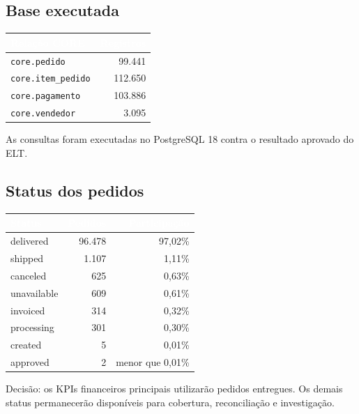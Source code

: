\documentclass[12pt,a4paper]{article}
\newcounter{none}
\newcommand{\CabecalhoTabela}[1]{\textcolor{white}{\textbf{#1}}}
\begin{document}
\subsection{Base
executada}\label{docs__analytics__evidencias_consultas_basicas_core.md__base-executada}

{\def\LTcaptype{none} %
\begin{longtable}[]{@{}lr@{}}
\toprule\noalign{}
\rowcolor{AzulCorporativo}
\CabecalhoTabela{Relação CORE} & \CabecalhoTabela{Registros} \\
\midrule\noalign{}
\endhead
\bottomrule\noalign{}
\endlastfoot
\nolinkurl{core.pedido} & 99.441 \\
\nolinkurl{core.item_pedido} & 112.650 \\
\nolinkurl{core.pagamento} & 103.886 \\
\nolinkurl{core.vendedor} & 3.095 \\
\end{longtable}
}

As consultas foram executadas no PostgreSQL 18 contra o resultado
aprovado do ELT.

\subsection{Status dos
pedidos}\label{docs__analytics__evidencias_consultas_basicas_core.md__status-dos-pedidos}

{\def\LTcaptype{none} %
\begin{longtable}[]{@{}lrr@{}}
\toprule\noalign{}
\rowcolor{AzulCorporativo}
\CabecalhoTabela{Status} & \CabecalhoTabela{Pedidos} & \CabecalhoTabela{Participação} \\
\midrule\noalign{}
\endhead
\bottomrule\noalign{}
\endlastfoot
delivered & 96.478 & 97,02\% \\
shipped & 1.107 & 1,11\% \\
canceled & 625 & 0,63\% \\
unavailable & 609 & 0,61\% \\
invoiced & 314 & 0,32\% \\
processing & 301 & 0,30\% \\
created & 5 & 0,01\% \\
approved & 2 & menor que 0,01\% \\
\end{longtable}
}

Decisão: os KPIs financeiros principais utilizarão pedidos entregues. Os
demais status permanecerão disponíveis para cobertura, reconciliação e
investigação.
\end{document}
